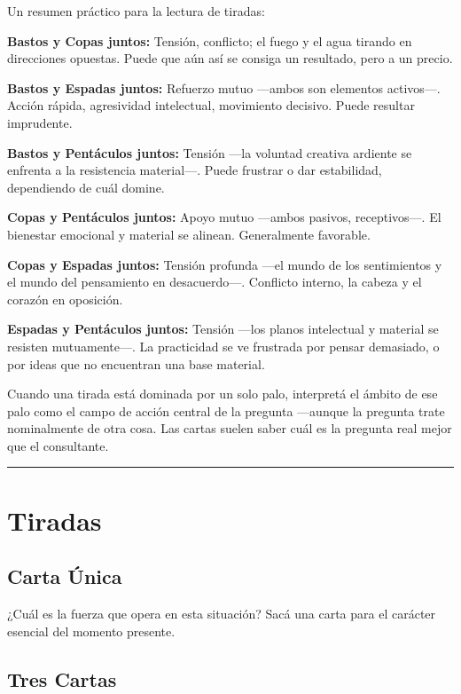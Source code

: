 Un resumen práctico para la lectura de tiradas:

\textbf{Bastos y Copas juntos:} Tensión, conflicto; el fuego y el agua tirando en direcciones opuestas. Puede que aún así se consiga un resultado, pero a un precio.

\textbf{Bastos y Espadas juntos:} Refuerzo mutuo ---ambos son elementos activos---. Acción rápida, agresividad intelectual, movimiento decisivo. Puede resultar imprudente.

\textbf{Bastos y Pentáculos juntos:} Tensión ---la voluntad creativa ardiente se enfrenta a la resistencia material---. Puede frustrar o dar estabilidad, dependiendo de cuál domine.

\textbf{Copas y Pentáculos juntos:} Apoyo mutuo ---ambos pasivos, receptivos---. El bienestar emocional y material se alinean. Generalmente favorable.

\textbf{Copas y Espadas juntos:} Tensión profunda ---el mundo de los sentimientos y el mundo del pensamiento en desacuerdo---. Conflicto interno, la cabeza y el corazón en oposición.

\textbf{Espadas y Pentáculos juntos:} Tensión ---los planos intelectual y material se resisten mutuamente---. La practicidad se ve frustrada por pensar demasiado, o por ideas que no encuentran una base material.

Cuando una tirada está dominada por un solo palo, interpretá el ámbito de ese palo como el campo de acción central de la pregunta ---aunque la pregunta trate nominalmente de otra cosa. Las cartas suelen saber cuál es la pregunta real mejor que el consultante.

\begin{center}\rule{0.5\linewidth}{0.5pt}\end{center}

\section{Tiradas}\label{spreads}

\subsection{Carta Única}\label{single-card}

¿Cuál es la fuerza que opera en esta situación? Sacá una carta para el carácter esencial del momento presente.

\subsection{Tres Cartas}\label{three-card}

